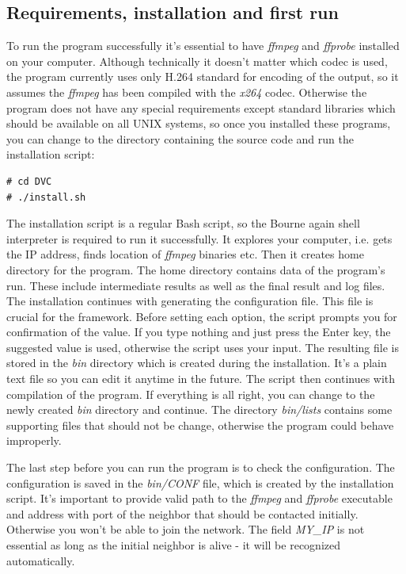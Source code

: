 \subsection{Requirements, installation and first run}
To run the program successfully it's essential to have \textit{ffmpeg} and \textit{ffprobe} installed on your computer. Although technically it doesn't matter which codec is used, the program currently uses only H.264 standard for encoding of the output, so it assumes the \textit{ffmpeg} has been compiled with the \textit{x264} codec. Otherwise the program does not have any special requirements except standard libraries which should be available on all UNIX systems, so once you installed these programs, you can change to the directory containing the source code and run the installation script:
\begin{verbatim}
# cd DVC
# ./install.sh
\end{verbatim}
The installation script is a regular Bash script, so the Bourne again shell interpreter is required to run it successfully. It explores your computer, i.e. gets the IP address, finds location of \textit{ffmpeg} binaries etc. Then it creates home directory for the program. The home directory contains data of the program's run. These include intermediate results as well as the final result and log files. The installation continues with generating the configuration file. This file is crucial for the framework. Before setting each option, the script prompts you for confirmation of the value. If you type nothing and just press the Enter key, the suggested value is used, otherwise the script uses your input. The resulting file is stored in the \textit{bin} directory which is created during the installation. It's a plain text file so you can edit it anytime in the future. The script then continues with compilation of the program. If everything is all right, you can change to the newly created \textit{bin} directory and continue. The directory \textit{bin/lists} contains some supporting files that should not be change, otherwise the program could behave improperly.

The last step before you can run the program is to check the configuration. The configuration is saved in the \textit{bin/CONF} file, which is created by the installation script. It's important to provide valid path to the \textit{ffmpeg} and \textit{ffprobe} executable and address with port of the neighbor that should be contacted initially. Otherwise you won't be able to join the network. The field \textit{MY\_IP} is not essential as long as the initial neighbor is alive - it will be recognized automatically. 

